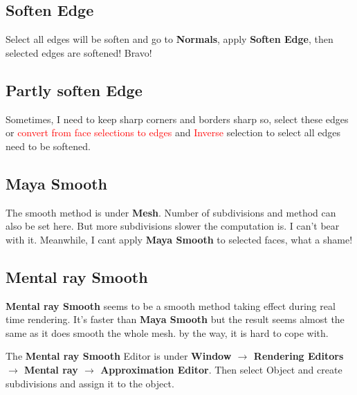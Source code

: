 \subsection{Soften Edge}
Select all edges will be soften and go to \textbf{Normals}, apply \textbf{Soften Edge}, then selected edges are softened! Bravo!

\subsection{Partly soften Edge}
Sometimes, I need to keep sharp corners and borders sharp so, select these edges or \textcolor{red}{convert from face selections to edges} and \textcolor{red}{Inverse} selection to select all edges need to be softened.

\subsection{Maya Smooth}
The smooth method is under \textbf{Mesh}. Number of subdivisions and method can also be set here. But more subdivisions slower the computation is. I can't bear with it. Meanwhile, I cant apply \textbf{Maya Smooth} to selected faces, what a shame!

\subsection{Mental ray Smooth}
\textbf{Mental ray Smooth} seems to be a smooth method taking effect during real time rendering. It's faster than \textbf{Maya Smooth} but the result seems almost the same as it does smooth the whole mesh. by the way, it is hard to cope with.

The \textbf{Mental ray Smooth} Editor is under \textbf{Window $ \rightarrow $ Rendering Editors $ \rightarrow $ Mental ray $ \rightarrow $ Approximation Editor}. Then select Object and create subdivisions and assign it to the object.

